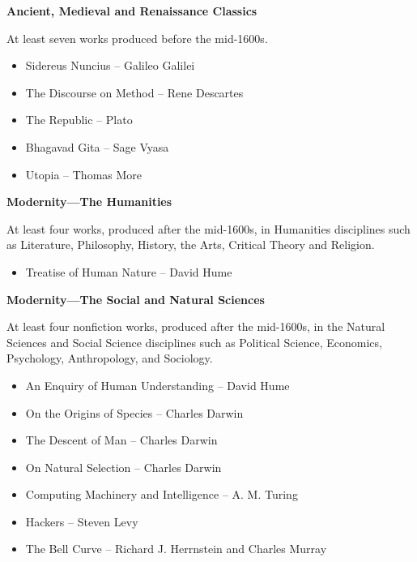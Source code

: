 \documentclass[11pt]{article}
\begin{document}
\par \textbf{Ancient, Medieval and Renaissance Classics}
\par At least seven works produced before the mid-1600s.
\begin{itemize}
	\item Sidereus Nuncius ­-- Galileo Galilei
	\item The Discourse on Method -- Rene Descartes
	\item The Republic -- Plato
	\item Bhagavad Gita -- Sage Vyasa
	\item Utopia -- Thomas More
\end{itemize}

\par \textbf{Modernity—The Humanities}
\par At least four works, produced after the mid-1600s, in Humanities disciplines such as Literature, Philosophy, History, the Arts, Critical Theory and Religion.
\begin{itemize}
	\item Treatise of Human Nature -- David Hume
\end{itemize}

\par \textbf{Modernity—The Social and Natural Sciences}
\par At least four nonfiction works, produced after the mid-1600s, in the Natural Sciences and Social Science disciplines such as Political Science, Economics, Psychology, Anthropology, and Sociology.
\begin{itemize}
	\item An Enquiry of Human Understanding -- David Hume
	\item On the Origins of Species -- Charles Darwin
	\item The Descent of Man -- Charles Darwin
	\item On Natural Selection -- Charles Darwin
	\item Computing Machinery and Intelligence -- A. M. Turing
	\item Hackers -- Steven Levy
	\item The Bell Curve -- Richard J. Herrnstein and Charles Murray
\end{itemize}
\end{document}
